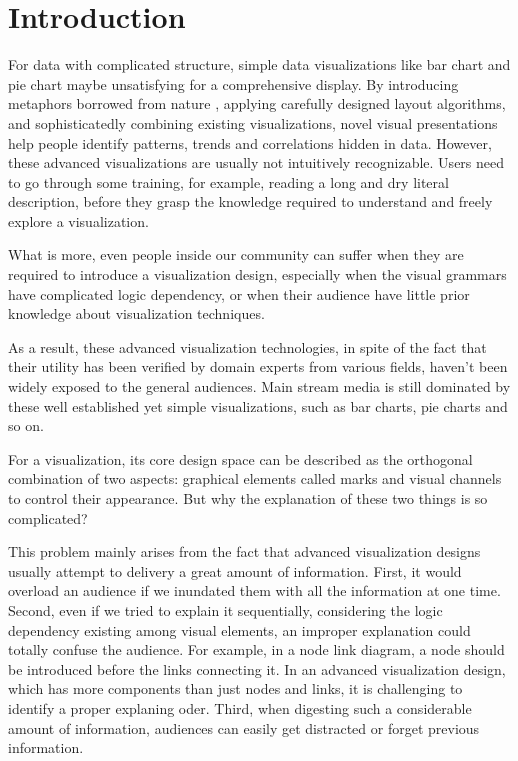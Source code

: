 
\section{Introduction} %
For data with complicated structure, simple data visualizations like bar chart and pie chart maybe unsatisfying for a comprehensive display. By introducing metaphors borrowed from nature \cite{cao_whisper:_2012,huron_visual_2013}, applying carefully designed layout algorithms\cite{wu_opinionflow:_2014,chi_morphable_2015}, and sophisticatedly combining existing visualizations\cite{zhao_x0023;fluxflow:_2014}, novel visual presentations help people identify patterns, trends and correlations hidden in data. However, these advanced visualizations are usually not intuitively recognizable. Users need to go through some training, for example, reading a long and dry literal description, before they grasp the knowledge required to understand and freely explore a visualization.\par
What is more, even people inside our community can suffer when they are required to introduce a visualization design, especially when the visual grammars have complicated logic dependency, or when their audience have little prior knowledge about visualization techniques.\par
As a result, these advanced visualization technologies, in spite of
the fact that their utility has been verified by domain experts from various fields, haven't been widely exposed to the general audiences. Main stream media is still dominated by these well established yet simple visualizations, such as bar charts, pie charts and so on.

For a visualization, its core design space can be described as the orthogonal combination of two aspects: graphical elements called marks and visual channels to control their appearance\cite{munzner_visualization_2014}. But why the explanation of these two things is so complicated? 

This problem mainly arises from the fact that advanced visualization designs usually attempt to delivery a great amount of information. First, it would overload an audience if we inundated them with all the information at one time. Second, even if we tried to explain it sequentially, considering the logic dependency existing among visual elements, an improper explanation could totally confuse the audience. For example, in a node link diagram, a node should be introduced before the links connecting it. In an advanced visualization design, which has more components than just nodes and links, it is challenging to identify a proper explaning oder. Third, when digesting such a considerable amount of information, audiences can easily get distracted or forget previous information.   

